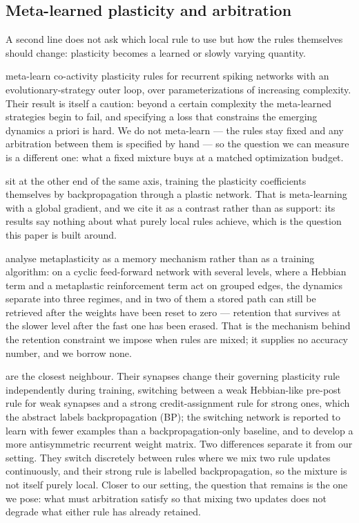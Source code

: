 \documentclass[11pt]{article}
\begin{document}
\subsection{Meta-learned plasticity and arbitration}
A second line does not ask which local rule to use but how the rules themselves
should change: plasticity becomes a learned or slowly varying quantity.

\citet{confavreux2025} meta-learn co-activity plasticity rules for recurrent
spiking networks with an evolutionary-strategy outer loop, over
parameterizations of increasing complexity. Their result is itself a caution:
beyond a certain complexity the meta-learned strategies begin to fail, and
specifying a loss that constrains the emerging dynamics a priori is hard. We do
not meta-learn --- the rules stay fixed and any arbitration between them is
specified by hand --- so the question we can measure is a different one: what a
fixed mixture buys at a matched optimization budget.

\citet{miconi2018differentiable} sit at the other end of the same axis, training
the plasticity coefficients themselves by backpropagation through a plastic
network. That is meta-learning with a global gradient, and we cite it as a
contrast rather than as support: its results say nothing about what purely local
rules achieve, which is the question this paper is built around.

\citet{zanardi2024metaplasticity} analyse metaplasticity as a memory mechanism
rather than as a training algorithm: on a cyclic feed-forward network with
several levels, where a Hebbian term and a metaplastic reinforcement term act on
grouped edges, the dynamics separate into three regimes, and in two of them a
stored path can still be retrieved after the weights have been reset to zero ---
retention that survives at the slower level after the fast one has been erased.
That is the mechanism behind the retention constraint we impose when rules are
mixed; it supplies no accuracy number, and we borrow none.

\citet{turcu2025switching} are the closest neighbour. Their synapses change
their governing plasticity rule independently during training, switching between
a weak Hebbian-like pre-post rule for weak synapses and a strong
credit-assignment rule for strong ones, which the abstract labels backpropagation
(BP); the switching network
is reported to learn with fewer examples than a backpropagation-only baseline,
and to develop a more antisymmetric recurrent weight matrix. Two differences
separate it from our setting. They switch discretely between rules where we mix
two rule updates continuously, and their strong rule is labelled backpropagation,
so the mixture is not itself purely local. Closer to our setting, the question that
remains is the one we pose: what must arbitration satisfy so that mixing two
updates does not degrade what either rule has already retained.
\end{document}
